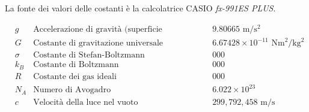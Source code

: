 
\vspace*{0.5cm}
La fonte dei valori delle costanti è la calcolatrice CASIO
\textit{fx-991ES PLUS}.

\begin{align*}
    &g      & \text{Accelerazione di gravità (superficie terrestre)} && 9.80665 \text{ m}/\text{s}^2\\
    &G      & \text{Costante di gravitazione universale}             && 6.67428 \times 10^{-11} \text{ Nm}^2/\text{kg}^2\\
    &\sigma & \text{Costante di Stefan-Boltzmann}                    && 000\\
    &k_B    & \text{Costante di Boltzmann}                           && 000\\
    &R      & \text{Costante dei gas ideali}                         && 000\\
    &N_A    & \text{Numero di Avogadro}                              && 6.022 \times 10^{23}\\
    &c      & \text{Velocità della luce nel vuoto}                   && 299,792,458 \text{ m}/\text{s}
\end{align*}